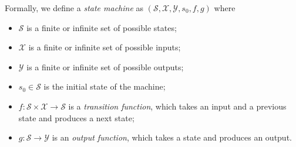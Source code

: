 Formally, we define a {\em state machine} as 
$(\mathcal{S}, \mathcal{X}, \mathcal{Y}, s_0, f, g)$ where 
\begin{itemize}
\item $\mathcal{S}$ is a finite or infinite set of possible states;
\item $\mathcal{X}$ is a finite  or infinite  set of possible inputs; 
\item $\mathcal{Y}$ is a finite or infinite set of possible outputs; 
\item $s_0 \in \mathcal{S}$ is the initial state of the machine; 
\item $f: \mathcal{S} \times \mathcal{X} \rightarrow \mathcal{S}$
is a {\em transition function}, which takes an input and a previous state
and produces  a  next state;
\item $g: \mathcal{S} \rightarrow  \mathcal{Y}$ is an {\em output
    function},  which takes a state and produces an output.
\end{itemize}


